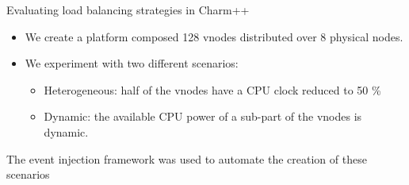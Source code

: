 \documentclass[11pt,xcolor=dvipsnames,presentation]{beamer}
\begin{document}
\begin{frame}[label=sec-3-0-10]{Evaluating load balancing strategies in Charm++}
\begin{itemize}
\item We create a platform composed 128 vnodes distributed over 8 physical nodes.

\item We experiment with two different scenarios:

\begin{itemize}
\item \alert{Heterogeneous}: half of the vnodes have a CPU clock reduced to 50 \%

\item \alert{Dynamic}: the available CPU power of a sub-part of the vnodes is dynamic.
\end{itemize}
\end{itemize}


The event injection framework was used to automate the creation of these scenarios
\end{frame}
\end{document}
